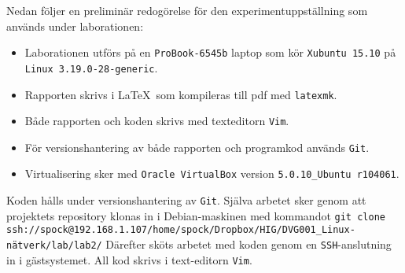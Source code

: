Nedan följer en preliminär redogörelse för den experimentuppställning som används
under laborationen:

\begin{itemize}
  \item Laborationen utförs på en \texttt{ProBook-6545b} laptop som kör
        \texttt{Xubuntu 15.10} på \texttt{Linux 3.19.0-28-generic}.

  \item Rapporten skrivs i \LaTeX\  som kompileras till pdf med \texttt{latexmk}.

  \item Både rapporten och koden skrivs med texteditorn \texttt{Vim}.

  \item För versionshantering av både rapporten och programkod används \texttt{Git}.

  \item Virtualisering sker med \texttt{Oracle VirtualBox} version
        \texttt{5.0.10\_Ubuntu r104061}.
\end{itemize}

Koden hålls under versionshantering av \texttt{Git}. Själva arbetet sker genom att 
projektets repository klonas in i Debian-maskinen med kommandot 
\texttt{git clone ssh://spock@192.168.1.107/home/spock/Dropbox/HIG/DVG001_Linux-nätverk/lab/lab2/}
Därefter sköts arbetet med koden genom en \texttt{SSH}-anslutning in i gästsystemet.
All kod skrivs i text-editorn \texttt{Vim}.


